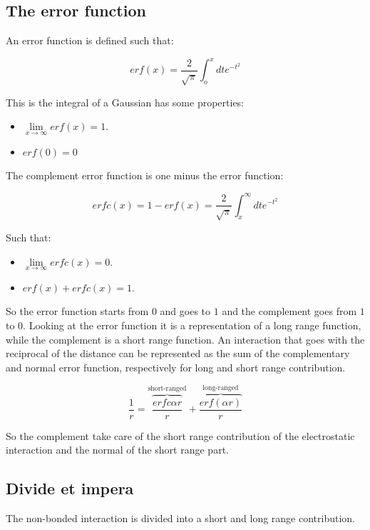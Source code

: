 	\subsection{The error function}
	An error function is defined such that:

	$$erf(x) = \frac{2}{\sqrt{\pi}}\int_o^x dte^{-t^2}$$

	This is the integral of a Gaussian has some properties:

	\begin{multicols}{2}
		\begin{itemize}
			\item $\lim\limits_{x\rightarrow \infty}erf(x) = 1$.
			\item $erf(0) = 0$
		\end{itemize}
	\end{multicols}

	The complement error function is one minus the error function:

	$$erfc(x) = 1- erf(x) = \frac{2}{\sqrt{\pi}}\int_x^\infty dte^{-t^2}$$

	Such that:

	\begin{multicols}{2}
		\begin{itemize}
			\item $\lim\limits_{x\rightarrow\infty} erfc(x) = 0$.
			\item $erf(x) + erfc(x) = 1$.
		\end{itemize}
	\end{multicols}

	So the error function starts from $0$ and goes to $1$ and the complement goes from $1$ to $0$.
	Looking at the error function it is a representation of a long range function, while the complement is a short range function.
	An interaction that goes with the reciprocal of the distance can be represented as the sum of the complementary and normal error function, respectively for long and short range contribution.

	$$\frac{1}{r} = \overbrace{\frac{erfc{\alpha r}}{r}}^{\text{short-ranged}} + \overbrace{\frac{erf(\alpha r)}{r}}^{\text{long-ranged}}$$

	So the complement take care of the short range contribution of the electrostatic interaction and the normal of the short range part.

	\subsection{Divide et impera}
	The non-bonded interaction is divided into a short and long range contribution.

